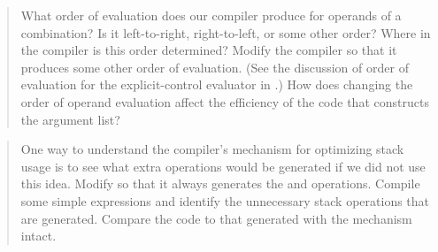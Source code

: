 \begin{quote}
 What order of evaluation does our
compiler produce for operands of a combination?  Is it left-to-right,
right-to-left, or some other order?  Where in the compiler is this order
determined?  Modify the compiler so that it produces some other order of
evaluation.  (See the discussion of order of evaluation for the
explicit-control evaluator in .)  How does changing the
order of operand evaluation affect the efficiency of the code that constructs
the argument list?
\end{quote}

\begin{quote}
 One way to understand the
compiler's  mechanism for optimizing stack usage is to see
what extra operations would be generated if we did not use this idea.  Modify
 so that it always generates the  and
 operations.  Compile some simple expressions and identify the
unnecessary stack operations that are generated.  Compare the code to that
generated with the  mechanism intact.
\end{quote}

